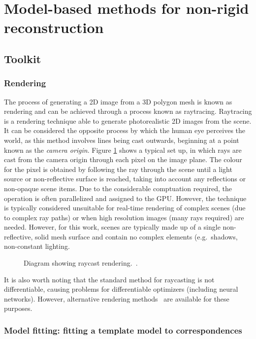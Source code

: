 \section{Model-based methods for non-rigid reconstruction}

\subsection{Toolkit}

\subsubsection{Rendering}
    The process of generating a 2D image from a 3D polygon mesh is known as rendering and can be achieved through a process known as raytracing. Raytracing is a rendering technique able to generate photorealistic 2D images from the scene. It can be considered the opposite process by which the human eye perceives the world, as this method involves lines being cast outwards, beginning at a point known as the \emph{camera origin}. Figure \ref{fig:raycasting} shows a typical set up, in which rays are cast from the camera origin through each pixel on the image plane. The colour for the pixel is obtained by following the ray through the scene until a light source or non-reflective surface is reached, taking into account any reflections or non-opaque scene items. Due to the considerable comptuation required, the operation is often parallelized and assigned to the GPU. However, the technique is typically considered unsuitable for real-time rendering of complex scenes (due to complex ray paths) or when high resolution images (many rays required) are needed. However, for this work, scenes are typically made up of a single non-reflective, solid mesh surface and contain no complex elements (e.g.\ shadows, non-constant lighting.

    \begin{figure}[H] %
        \caption{Diagram showing raycast rendering.~\cite{rendering}.}
        \label{fig:raycasting}
    \end{figure}

    It is also worth noting that the standard method for raycasting is not differentiable, causing problems for differentiable optimizers (including neural networks). However, alternative rendering methods~\cite{loper2014opendr} are available for these purposes.

\subsubsection{Model fitting: fitting a template model to correspondences}

